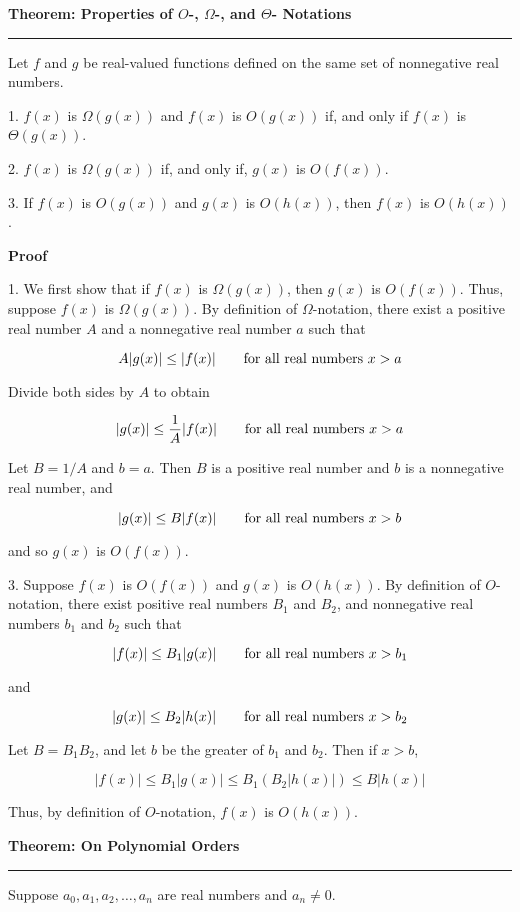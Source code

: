 {\bf Theorem: Properties of $O$-, $\Omega$-, and $\Theta$- Notations}
\vskip 1mm
\hrule

\vskip 3mm
Let $f$ and $g$ be real-valued functions defined on the same set of nonnegative real numbers.

\vskip 1mm
1. $f(x)$ is $\Omega(g(x))$ and $f(x)$ is $O(g(x))$ if, and only if $f(x)$ is $\Theta(g(x))$.

\vskip 3mm
2. $f(x)$ is $\Omega(g(x))$ if, and only if, $g(x)$ is $O(f(x))$.

\vskip 3mm
3. If $f(x)$ is $O(g(x))$ and $g(x)$ is $O(h(x))$, then $f(x)$ is $O(h(x))$.

\vskip 3mm
{\bf Proof}

\vskip 1mm
1. We first show that if $f(x)$ is $\Omega(g(x))$, then $g(x)$ is $O(f(x))$. Thus, suppose $f(x)$ is $\Omega(g(x))$. By definition of $\Omega$-notation, there exist a positive real number $A$ and a nonnegative real number $a$ such that

$$A|g(x)|\leq|f(x)|\qquad\hbox{for all real numbers $x>a$}$$

Divide both sides by $A$ to obtain

$$|g(x)|\leq{1\over A}|f(x)|\qquad\hbox{for all real numbers $x>a$}$$

Let $B=1/A$ and $b=a$. Then $B$ is a positive real number and $b$ is a nonnegative real number, and

$$|g(x)|\leq B|f(x)|\qquad\hbox{for all real numbers $x>b$}$$

and so $g(x)$ is $O(f(x))$.

\vskip 3mm
3. Suppose $f(x)$ is $O(f(x))$ and $g(x)$ is $O(h(x))$. By definition of $O$-notation, there exist positive real numbers $B_1$ and $B_2$, and nonnegative real numbers $b_1$ and $b_2$ such that

$$|f(x)|\leq B_1|g(x)|\qquad\hbox{for all real numbers $x>b_1$}$$

and

$$|g(x)|\leq B_2|h(x)|\qquad\hbox{for all real numbers $x>b_2$}$$

Let $B=B_1B_2$, and let $b$ be the greater of $b_1$ and $b_2$. Then if $x>b$,

$$|f(x)|\leq B_1|g(x)|\leq B_1(B_2|h(x)|)\leq B|h(x)|$$

Thus, by definition of $O$-notation, $f(x)$ is $O(h(x))$.

\filbreak
\vskip 1cm
{\bf Theorem: On Polynomial Orders}
\vskip 1mm
\hrule

\vskip 3mm
Suppose $a_0,a_1,a_2,\ldots,a_n$ are real numbers and $a_n\neq 0$.

